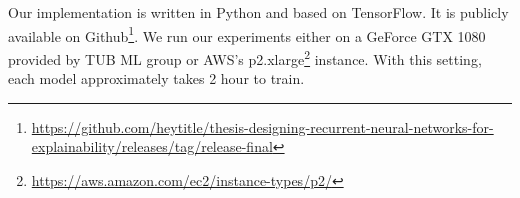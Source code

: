 Our implementation is written in Python and based on TensorFlow\cite{AbadiTensorFlowLargeScaleMachine2016}. It is publicly available on Github\footnote{\url{https://github.com/heytitle/thesis-designing-recurrent-neural-networks-for-explainability/releases/tag/release-final}}.  We run our experiments either on a GeForce GTX 1080 provided by TUB ML group or AWS's p2.xlarge\footnote{\url{https://aws.amazon.com/ec2/instance-types/p2/}} instance. With this setting, each model approximately takes 2 hour to train.


 
%
%
%
%
%
%

